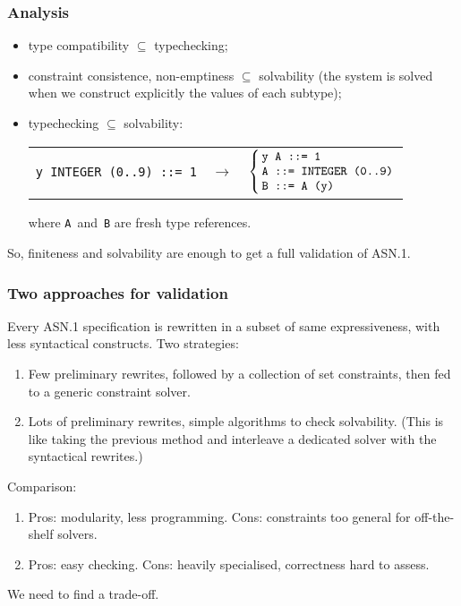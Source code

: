 \documentclass[compress,dvips,xcolor={dvipsnames},t]{beamer}
\newcommand\ASN{\textsf{ASN.1}\xspace}
\begin{document}
\begin{frame}
\frametitle{Analysis}

\begin{itemize}

  \item type compatibility $\subseteq$ typechecking;

  \item constraint consistence, non-emptiness $\subseteq$ solvability
        (the system is solved when we construct explicitly the values
        of each subtype);

  \item typechecking $\subseteq$ solvability:
\begin{tabular}{@{}r@{\,}c@{\,}l@{}}
   \texttt{y INTEGER (0..9) ::= 1}
   & $\rightarrow$ 
   & $\left\{
       \begin{tabular}{@{\,}l@{}} 
           \texttt{y A ::= 1} \\
           \texttt{A ::= INTEGER (0..9)} \\
           \texttt{B ::= A (y)}
        \end{tabular}
     \right.$
\end{tabular}
where \texttt{A}~and~\texttt{B} are fresh type references.

\end{itemize}

So, finiteness and solvability are enough to get a full validation of
\ASN.

\end{frame}

\begin{frame}
\frametitle{Two approaches for validation}

Every \ASN specification is rewritten in a subset of same
expressiveness, with less syntactical constructs. Two strategies:
\begin{enumerate}

  \item Few preliminary rewrites, followed by a collection of set
  constraints, then fed to a generic constraint solver.

  \item Lots of preliminary rewrites, simple algorithms to check
    solvability. (This is like taking the previous method and
    interleave a dedicated solver with the syntactical rewrites.)

\end{enumerate}
Comparison:
\begin{enumerate}

\item Pros: modularity, less programming. Cons: constraints too
  general for off-the-shelf solvers.

  \item Pros: easy checking. Cons: heavily specialised, correctness
    hard to assess.

\end{enumerate}
We need to find a trade-off.

\end{frame}
\end{document}
